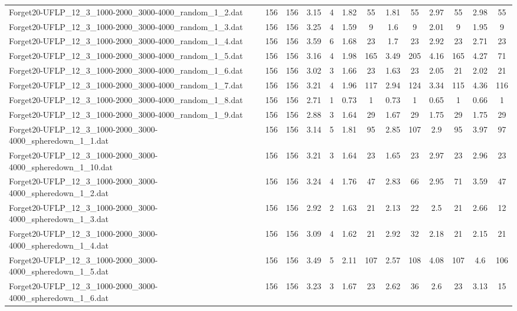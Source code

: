\begin{table}[!ht]
{\begin{tabular}{lcccccccccccc}
Forget20-UFLP\_12\_3\_1000-2000\_3000-4000\_random\_1\_2.dat & 156 & 156 & 3.15 & 4 & 1.82 & 55 & 1.81 & 55 & 2.97 & 55 & 2.98 & 55 \\
Forget20-UFLP\_12\_3\_1000-2000\_3000-4000\_random\_1\_3.dat & 156 & 156 & 3.25 & 4 & 1.59 & 9 & 1.6 & 9 & 2.01 & 9 & 1.95 & 9 \\
Forget20-UFLP\_12\_3\_1000-2000\_3000-4000\_random\_1\_4.dat & 156 & 156 & 3.59 & 6 & 1.68 & 23 & 1.7 & 23 & 2.92 & 23 & 2.71 & 23 \\
Forget20-UFLP\_12\_3\_1000-2000\_3000-4000\_random\_1\_5.dat & 156 & 156 & 3.16 & 4 & 1.98 & 165 & 3.49 & 205 & 4.16 & 165 & 4.27 & 71 \\
Forget20-UFLP\_12\_3\_1000-2000\_3000-4000\_random\_1\_6.dat & 156 & 156 & 3.02 & 3 & 1.66 & 23 & 1.63 & 23 & 2.05 & 21 & 2.02 & 21 \\
Forget20-UFLP\_12\_3\_1000-2000\_3000-4000\_random\_1\_7.dat & 156 & 156 & 3.21 & 4 & 1.96 & 117 & 2.94 & 124 & 3.34 & 115 & 4.36 & 116 \\
Forget20-UFLP\_12\_3\_1000-2000\_3000-4000\_random\_1\_8.dat & 156 & 156 & 2.71 & 1 & 0.73 & 1 & 0.73 & 1 & 0.65 & 1 & 0.66 & 1 \\
Forget20-UFLP\_12\_3\_1000-2000\_3000-4000\_random\_1\_9.dat & 156 & 156 & 2.88 & 3 & 1.64 & 29 & 1.67 & 29 & 1.75 & 29 & 1.75 & 29 \\
Forget20-UFLP\_12\_3\_1000-2000\_3000-4000\_spheredown\_1\_1.dat & 156 & 156 & 3.14 & 5 & 1.81 & 95 & 2.85 & 107 & 2.9 & 95 & 3.97 & 97 \\
Forget20-UFLP\_12\_3\_1000-2000\_3000-4000\_spheredown\_1\_10.dat & 156 & 156 & 3.21 & 3 & 1.64 & 23 & 1.65 & 23 & 2.97 & 23 & 2.96 & 23 \\
Forget20-UFLP\_12\_3\_1000-2000\_3000-4000\_spheredown\_1\_2.dat & 156 & 156 & 3.24 & 4 & 1.76 & 47 & 2.83 & 66 & 2.95 & 71 & 3.59 & 47 \\
Forget20-UFLP\_12\_3\_1000-2000\_3000-4000\_spheredown\_1\_3.dat & 156 & 156 & 2.92 & 2 & 1.63 & 21 & 2.13 & 22 & 2.5 & 21 & 2.66 & 12 \\
Forget20-UFLP\_12\_3\_1000-2000\_3000-4000\_spheredown\_1\_4.dat & 156 & 156 & 3.09 & 4 & 1.62 & 21 & 2.92 & 32 & 2.18 & 21 & 2.15 & 21 \\
Forget20-UFLP\_12\_3\_1000-2000\_3000-4000\_spheredown\_1\_5.dat & 156 & 156 & 3.49 & 5 & 2.11 & 107 & 2.57 & 108 & 4.08 & 107 & 4.6 & 106 \\
Forget20-UFLP\_12\_3\_1000-2000\_3000-4000\_spheredown\_1\_6.dat & 156 & 156 & 3.23 & 3 & 1.67 & 23 & 2.62 & 36 & 2.6 & 23 & 3.13 & 15 \\

\end{tabular}}
\end{table}

